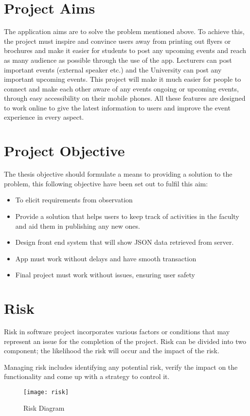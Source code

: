 \section{Project Aims}
The application aims are to solve the problem mentioned above. To achieve this, the project must inspire and convince users away from printing out flyers or brochures and make it easier for students to post any upcoming events and reach as many audience as possible through the use of the app. Lecturers can post important events (external speaker etc.) and the University can post any important upcoming events. This project will make it much easier for people to connect and make each other aware of any events ongoing or upcoming events, through easy accessibility on their mobile phones. All these features are designed to work online to give the latest information to users and improve the event experience in every aspect.

\section{Project Objective}
The thesis objective should formulate a means to providing a solution to the problem, this following objective have been set out to fulfil this aim:
\begin{itemize}
\item To elicit requirements from observation
\item Provide a solution that helps users to keep track of activities in the faculty and aid them in publishing any new ones. 
\item Design front end system that will show JSON data retrieved from server.
\item App must work without delays and have smooth transaction 
\item Final project must work without issues, ensuring user safety  	
\end{itemize}

\section{Risk}
Risk in software project incorporates various factors or conditions that may represent an issue for the completion of the project. Risk can be divided into two component; the likelihood the risk will occur and the impact of the risk. 

Managing risk includes identifying any potential risk, verify the impact on the functionality and come up with a strategy to control it.
\begin{figure}[h]
	\texttt{[image: risk]}	
	\caption{Risk Diagram}
	\label{fib:risk}
\end{figure}

